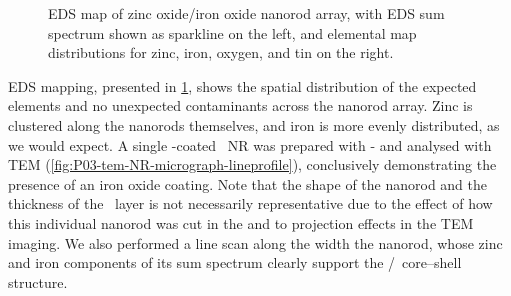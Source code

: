 \documentclass[webedition,openright,titles,swedish,english]{LuaUUThesis}\usepackage[]{graphicx}\usepackage[]{xcolor}
\begin{document}
\begin{figure}[tbp]
\caption[EDS map of zinc oxide/iron oxide nanorod array]{%
   EDS map of zinc oxide/iron oxide nanorod array, with EDS sum spectrum shown
   as sparkline on the left, and elemental map distributions for zinc, iron,
   oxygen, and tin on the right.}
\label{fig:P03-eds-map}
\end{figure}

\Gls{EDS} mapping, presented in \cref{fig:P03-eds-map}, shows the spatial
distribution of the expected elements and no unexpected contaminants
across the nanorod array.
Zinc is clustered along the nanorods themselves, and iron is more evenly distributed,
as we would expect.
A single \ironox-coated \ZnO\ \gls{NR} was prepared with -
and analysed with \gls{TEM} (\cref{fig:P03-tem-NR-micrograph-lineprofile}), conclusively
demonstrating the presence of an iron oxide coating.
Note that the shape of the nanorod and the thickness of the \ironox\ layer
is not necessarily representative due to the effect of how this individual nanorod
was cut in the  and to projection effects in the \gls{TEM} imaging.
We also performed a line scan along the width the nanorod, whose zinc and iron
components of its sum spectrum clearly support the \ZnO/\ironox\ core--shell structure.



%
\end{document}
